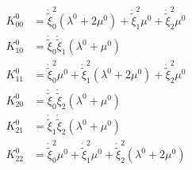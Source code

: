 \begin{equation}\begin{aligned}
K^0_{00} &= \mathring{\widetilde{\xi}}_0^{2} \left(\lambda^{0} + 2 \mu^{0}\right) + \mathring{\widetilde{\xi}}_1^{2} \mu^{0} + \mathring{\widetilde{\xi}}_2^{2} \mu^{0}\\
K^0_{10} &= \mathring{\widetilde{\xi}}_0 \mathring{\widetilde{\xi}}_1 \left(\lambda^{0} + \mu^{0}\right)\\
K^0_{11} &= \mathring{\widetilde{\xi}}_0^{2} \mu^{0} + \mathring{\widetilde{\xi}}_1^{2} \left(\lambda^{0} + 2 \mu^{0}\right) + \mathring{\widetilde{\xi}}_2^{2} \mu^{0}\\
K^0_{20} &= \mathring{\widetilde{\xi}}_0 \mathring{\widetilde{\xi}}_2 \left(\lambda^{0} + \mu^{0}\right)\\
K^0_{21} &= \mathring{\widetilde{\xi}}_1 \mathring{\widetilde{\xi}}_2 \left(\lambda^{0} + \mu^{0}\right)\\
K^0_{22} &= \mathring{\widetilde{\xi}}_0^{2} \mu^{0} + \mathring{\widetilde{\xi}}_1^{2} \mu^{0} + \mathring{\widetilde{\xi}}_2^{2} \left(\lambda^{0} + 2 \mu^{0}\right)\\
\end{aligned}\end{equation}

